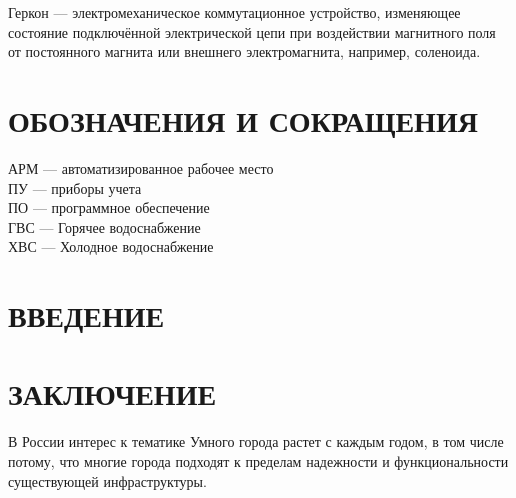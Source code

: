 \documentclass[a4paper,12pt]{article}
\begin{document}
Геркон --- электромеханическое коммутационное устройство, изменяющее состояние подключённой электрической цепи при воздействии магнитного поля от постоянного магнита или внешнего электромагнита, например, соленоида.



\pagebreak

\section*{\centering ОБОЗНАЧЕНИЯ И СОКРАЩЕНИЯ}
\noindent
АРМ --- автоматизированное рабочее место\\
ПУ --- приборы учета\\
ПО --- программное обеспечение\\
ГВС --- Горячее водоснабжение\\
ХВС --- Холодное водоснабжение\\



\pagebreak



\tableofcontents

\pagebreak

\section*{\centering ВВЕДЕНИЕ}
\pagebreak

%
\pagebreak
\pagebreak

\pagebreak

\pagebreak

\pagebreak


\section*{\centering ЗАКЛЮЧЕНИЕ}
В России интерес к тематике Умного города растет с каждым годом, в том числе потому, что многие города подходят к пределам надежности и функциональности существующей инфраструктуры.
\end{document}
